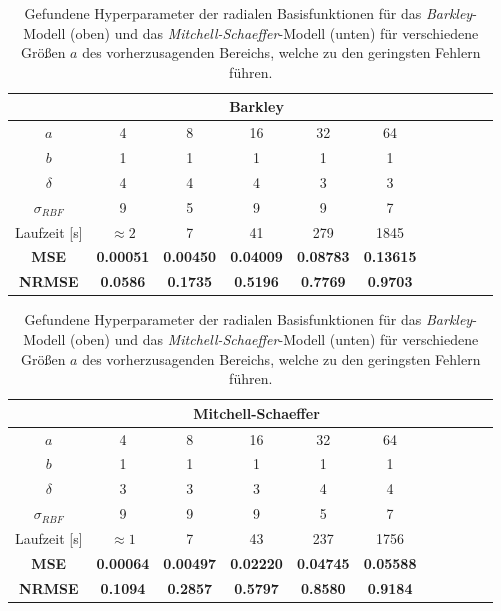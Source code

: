 \begin{table}[h]
	\centering

	\begin{tabular}{|c|c|c|c|c|c|c|c|c|c|c|}
		\multicolumn{1}{c|}{} & \multicolumn{5}{c|}{Barkley}\\ 
		\hline \hline 
		\rule[-1ex]{0pt}{2.5ex} $a$ & 4 & 8 & 16 & 32 & 64\\ 
		\hline 
		\rule[-1ex]{0pt}{2.5ex} $b$ & 1 & 1 & 1  & 1  & 1 \\ 
		\hline 
		\rule[-1ex]{0pt}{2.5ex} $\delta$ & 4 & 4 & 4 & 3 & 3 \\ 
		\hline 
		\rule[-1ex]{0pt}{2.5ex} $\sigma_{RBF}$ & 9 & 5 & 9 & 9 & 7\\ 
		\hline 
		\rule[-1ex]{0pt}{2.5ex} Laufzeit [s] & $\approx 2$ & 7 & 41 & 279 & 1845\\ 
		\hline 
		\rule[-1ex]{0pt}{2.5ex} \textbf{MSE} & \textbf{0.00051} & \textbf{0.00450} & \textbf{0.04009} & \textbf{0.08783} & \textbf{0.13615}\\ 
		\hline 
		\rule[-1ex]{0pt}{2.5ex} \textbf{NRMSE} & \textbf{0.0586} & \textbf{0.1735} & \textbf{0.5196} & \textbf{0.7769} & \textbf{0.9703} \\ 
		\hline 
	\end{tabular} 
	
	\vspace{0.75cm}

	\centering

	\begin{tabular}{|c|c|c|c|c|c|c|c|c|c|c|}
		\multicolumn{1}{c|}{} & \multicolumn{5}{c|}{Mitchell-Schaeffer} \\ 
		\hline \hline 
		\rule[-1ex]{0pt}{2.5ex} $a$ & 4 & 8 & 16 & 32 & 64 \\ 
		\hline 
		\rule[-1ex]{0pt}{2.5ex} $b$ & 1 & 1 & 1  & 1  & 1\\ 
		\hline 
		\rule[-1ex]{0pt}{2.5ex} $\delta$ & 3 & 3 & 3 & 4 & 4 \\ 
		\hline 
		\rule[-1ex]{0pt}{2.5ex} $\sigma_{RBF}$ & 9 & 9 & 9 & 5 & 7 \\ 
		\hline 
		\rule[-1ex]{0pt}{2.5ex} Laufzeit [s] & $\approx 1$ & 7 & 43 & 237 & 1756\\
		\hline 
		\rule[-1ex]{0pt}{2.5ex} \textbf{MSE} & \textbf{0.00064} & \textbf{0.00497} & \textbf{0.02220} & \textbf{0.04745} & \textbf{0.05588} \\ 
		\hline 
		\rule[-1ex]{0pt}{2.5ex} \textbf{NRMSE} & \textbf{0.1094} & \textbf{0.2857} & \textbf{0.5797} & \textbf{0.8580} & \textbf{0.9184} \\ 
		\hline 
	\end{tabular} 

	\caption{Gefundene Hyperparameter der radialen Basisfunktionen für das \textit{Barkley}-Modell (oben) und das \textit{Mitchell-Schaeffer}-Modell (unten) für verschiedene Größen $a$ des vorherzusagenden Bereichs, welche zu den geringsten Fehlern führen.}
\label{tab:exp_inner_cross_rbf_results}
\end{table}


